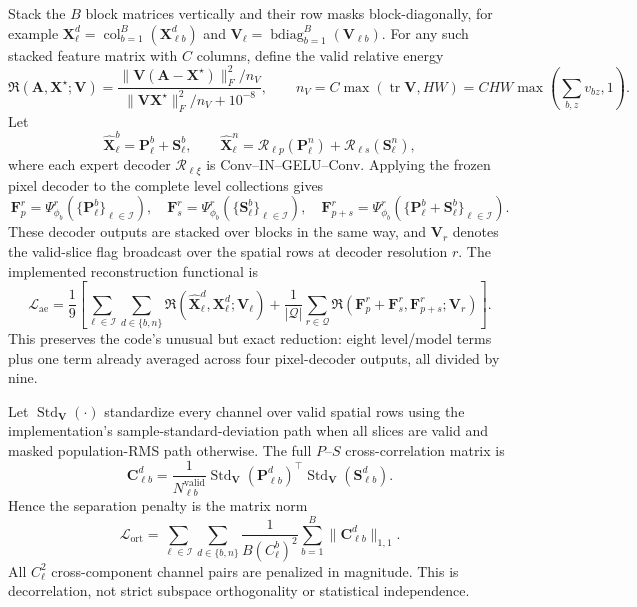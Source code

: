 \documentclass[10pt]{article}
\newcommand{\cI}{\mathcal{I}}
\newcommand{\cQ}{\mathcal{Q}}
\newcommand{\cL}{\mathcal{L}}
\begin{document}
Stack the $B$ block matrices vertically and their row masks block-diagonally,
for example
$\bm X_\ell^d=\operatorname{col}_{b=1}^B(\bm X_{\ell b}^d)$ and
$\bm V_\ell=\operatorname{bdiag}_{b=1}^B(\bm V_{\ell b})$.  For any such
stacked feature matrix with $C$ columns, define the valid relative energy
\begin{equation}
 \mathfrak R(\bm A,\bm X^\star;\bm V)
 =
 \frac{\|\bm V(\bm A-\bm X^\star)\|_F^2/n_V}
      {\|\bm V\bm X^\star\|_F^2/n_V+10^{-8}},
 \qquad
 n_V=C\max(\operatorname{tr}\bm V,HW)
 =CHW\max\!\left(\sum_{b,z} v_{bz},1\right).
 \label{eq:relative-energy}
\end{equation}
Let
\[
 \widehat{\bm X}_{\ell}^b=\bm P_{\ell}^b+\bm S_{\ell}^b,\qquad
 \widehat{\bm X}_{\ell}^n
 =\mathcal R_{\ell p}(\bm P_{\ell}^n)
  +\mathcal R_{\ell s}(\bm S_{\ell}^n),
\]
where each expert decoder $\mathcal R_{\ell\xi}$ is
Conv--IN--GELU--Conv.  Applying the frozen pixel decoder to the complete
level collections gives
\[
 \bm F_p^r=\Psi_{\phi_b}^r(\{\bm P_\ell^b\}_{\ell\in\cI}),\quad
 \bm F_s^r=\Psi_{\phi_b}^r(\{\bm S_\ell^b\}_{\ell\in\cI}),\quad
 \bm F_{p+s}^r=\Psi_{\phi_b}^r(
   \{\bm P_\ell^b+\bm S_\ell^b\}_{\ell\in\cI}).
\]
These decoder outputs are stacked over blocks in the same way, and $\bm V_r$
denotes the valid-slice flag broadcast over the spatial rows at decoder
resolution $r$.  The implemented reconstruction functional is
\begin{equation}
\boxed{
 \cL_{\mathrm{ae}}
 =\frac{1}{9}\left[
   \sum_{\ell\in\cI}\sum_{d\in\{b,n\}}
   \mathfrak R(\widehat{\bm X}_{\ell}^d,\bm X_{\ell}^d;\bm V_{\ell})
   +\frac{1}{|\cQ|}\sum_{r\in\cQ}
   \mathfrak R(\bm F_p^r+\bm F_s^r,\bm F_{p+s}^r;\bm V_r)
 \right].}
\label{eq:complete-reconstruction}
\end{equation}
This preserves the code's unusual but exact reduction: eight level/model terms
plus one term already averaged across four pixel-decoder outputs, all divided
by nine.

Let $\operatorname{Std}_{\bm V}(\cdot)$ standardize every channel over valid
spatial rows using the implementation's sample-standard-deviation path when
all slices are valid and masked population-RMS path otherwise.  The full
$P$--$S$ cross-correlation matrix is
\[
 \bm C_{\ell b}^{d}
 =\frac{1}{N_{\ell b}^{\mathrm{valid}}}
   \operatorname{Std}_{\bm V}(\bm P_{\ell b}^{d})^\top
   \operatorname{Std}_{\bm V}(\bm S_{\ell b}^{d}).
\]
Hence the separation penalty is the matrix norm
\begin{equation}
\boxed{
 \cL_{\mathrm{ort}}
 =\sum_{\ell\in\cI}\sum_{d\in\{b,n\}}
  \frac{1}{B(C_\ell^b)^2}
  \sum_{b=1}^{B}\|\bm C_{\ell b}^{d}\|_{1,1}.}
\label{eq:matrix-correlation}
\end{equation}
All $C_\ell^2$ cross-component channel pairs are penalized in magnitude.  This
is decorrelation, not strict subspace orthogonality or statistical independence.
\end{document}
